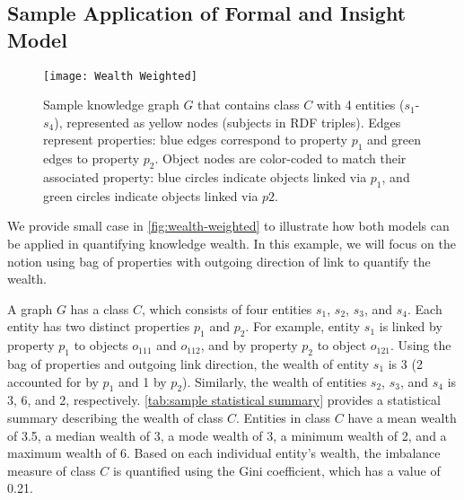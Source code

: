 \subsection{Sample Application of Formal and Insight Model}

\begin{figure}[!htbp]
    \centering
    \texttt{[image: Wealth Weighted]}
    \caption{Sample knowledge graph \(G\) that contains class \(C\) with 4 entities (\(s_1\)-\(s_4\)), represented as yellow nodes (subjects in RDF triples). Edges represent properties: blue edges correspond to property \(p_1\) and green edges to property \(p_2\). Object nodes are color-coded to match their associated property: blue circles indicate objects linked via \(p_1\), and green circles indicate objects linked via \(p2\).} \label{fig:wealth-weighted}
\end{figure}

We provide small case in \autoref{fig:wealth-weighted} to illustrate how both models can be applied in quantifying knowledge wealth. In this example, we will focus on the notion using bag of properties with outgoing direction of link to quantify the wealth.

A graph \(G\) has a class \(C\), which consists of four entities \(s_1\), \(s_2\), \(s_3\), and \(s_4\). Each entity has two distinct properties \(p_1\) and \(p_2\). For example, entity \(s_1\) is linked by property \(p_1\) to objects \(o_{111}\) and \(o_{112}\), and by property \(p_2\) to object \(o_{121}\). Using the bag of properties and outgoing link direction, the wealth of entity \(s_1\) is 3 (2 accounted for by \(p_1\) and 1 by \(p_2\)). Similarly, the wealth of entities \(s_2\), \(s_3\), and \(s_4\) is 3, 6, and 2, respectively. \autoref{tab:sample statistical summary} provides a statistical summary describing the wealth of class \(C\). Entities in class \(C\) have a mean wealth of 3.5, a median wealth of 3, a mode wealth of 3, a minimum wealth of 2, and a maximum wealth of 6. Based on each individual entity's wealth, the imbalance measure of class \(C\) is quantified using the Gini coefficient, which has a value of 0.21.

